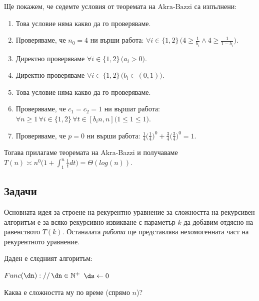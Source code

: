 \begin{solution}
	Ще покажем, че седемте условия от $\hyperref[th:akra-bazzi]{\text{теоремата на Akra-Bazzi}}$ са изпълнени:
	\begin{enumerate}
		\item Това условие няма какво да го проверяваме.
		\vspace{-0.15cm}
		\item Проверяваме, че $n_0=4$ ни върши работа: $\forall i\in\{1,2\}\,\Big(4\ge\frac1{b_i}\land 4\ge\frac1{1-b_i}\Big)$.
		\vspace{-0.15cm}
		\item Директно проверяваме $\forall i\in\{1,2\}\,\big(a_i>0\big)$.
		\item Директно проверяваме $\forall i\in\{1,2\}\,\big(b_i\in(0,1)\big)$.
		\item Това условие няма какво да го проверяваме.
		\item Проверяваме, че $c_1=c_2=1$ ни вършат работа: $\forall n\ge1\,\forall i\in\{1,2\}\,\forall t\in[b_in,n]\big(1\le1\le1\big)$.
		\vspace{-0.5cm}
		\item Проверяваме, че $p=0$ ни върши работа: $\frac14\big(\frac14\big)^0+\frac34\big(\frac34\big)^0=1$.
	\end{enumerate}
	\vspace{-0.2cm}
	Тогава прилагаме теоремата на Akra-Bazzi и получаваме $T(n)\asymp n^0\bigg(1+\displaystyle\int_1^n\frac1tdt\bigg)=\Theta(log(n))$.
\end{solution}\leavevmode\newline


\subsection{Задачи}

Основната идея за строене на рекурентно уравнение за сложността на рекурсивен алгоритъм е за всяко рекурсивно извикване с параметър $k$ да добавим отдясно на равенството $T(k)$. Останалата \emph{работа} ще представлява нехомогенната част на рекурентното уравнение.\\

\begin{problem}
	Даден е следният алгоритъм:
	\begin{pseudocode}
		
		
		$Func(\dn)://\,\dn\in\mathbb{N}^+$
		\Mybegin
		{
			$\ds\leftarrow0$\;
			\KwRet{$\ds$}\;
		}
	\end{pseudocode}
	Каква е сложността му по време (спрямо $n$)?
\end{problem}

